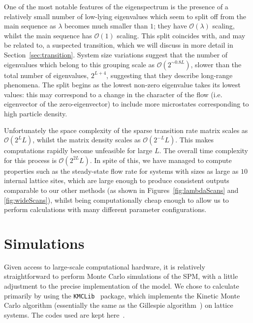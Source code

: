\documentclass[
reprint, amsmath,amssymb, aps,
 prx,
]{revtex4-1}
\begin{document}
One of the most notable features of the eigenspectrum is the presence
of a relatively small number of low-lying eigenvalues which seem to
split off from the main sequence as $\lambda$ becomes much smaller
than $1$; they have $\mathcal{O}(\lambda)$ scaling, whilst the main
sequence has $\mathcal{O}(1)$ scaling. This split coincides with, and
may be related to, a suspected transition, which we will discuss in
more detail in Section~\ref{sec:transition}.  System size variations
suggest that the number of eigenvalues which belong to this grouping
scale as $\mathcal{O}(2^{\sim 0.8L})$, slower than the total number of
eigenvalues, $2^{L+4}$, suggesting that they describe long-range
phenomena.  The split begins as the lowest non-zero eigenvalue takes
its lowest values: this may correspond to a change in the character of
the flow (i.e. eigenvector of the zero-eigenvector) to include more
microstates corresponding to high particle density.



Unfortunately the space complexity of the sparse transition rate
matrix scales as $\mathcal{O}(2^L L)$, whilst the matrix density
scales as $\mathcal{O}(2^{-L} L)$.  This makes computations rapidly
become unfeasible for large $L$. The overall time complexity for this
process is $\mathcal{O}(2^{2L}L)$.  In spite of this, we have managed
to compute properties such as the steady-state flow rate for systems
with sizes as large as $10$ internal lattice sites, which are large
enough to produce consistent outputs comparable to our other methods
(as shown in Figures~\ref{fig:lambdaScans} and \ref{fig:wideScans}),
whilst being computationally cheap enough to allow us to perform
calculations with many different parameter configurations.


\section{Simulations}
\label{sec:simulations}
Given access to large-scale computational hardware, it is relatively straightforward to perform Monte Carlo simulations of the SPM, with a little adjustment to the precise implementation of the model. 
We chose to calculate primarily by using the \texttt{KMCLib}~\cite{leetmaa2014kmclib}
package, which implements the Kinetic Monte Carlo algorithm
(essentially the same as the Gillespie algorithm~\cite{Gillespie1977,
 Bortz1975, Prados1997}) on lattice systems. The codes used are kept
here~\cite{jHellGitRepo}.
\end{document}
